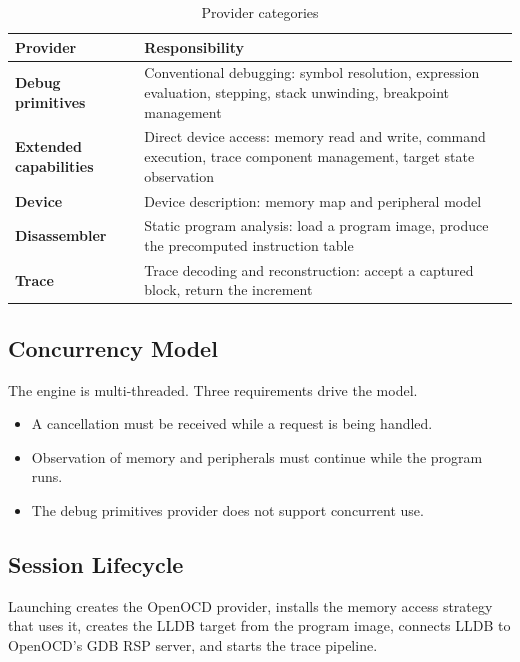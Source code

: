 \begin{table}[H]
    \centering
    \caption{Provider categories}
    \label{tab:providers}
    \begin{tabularx}{\linewidth}{| @{}>{\hsize\bfseries}Y | >{\hsize}Y@{} |}
        \hline
        Provider & \textbf{Responsibility} \\
        \hline
        Debug primitives & Conventional debugging: symbol resolution, expression evaluation, stepping, stack unwinding, breakpoint management \\
        \hline
        Extended capabilities & Direct device access: memory read and write, command execution, trace component management, target state observation \\
        \hline
        Device & Device description: memory map and peripheral model \\
        \hline
        Disassembler & Static program analysis: load a program image, produce the precomputed instruction table \\
        \hline
        Trace & Trace decoding and reconstruction: accept a captured block, return the increment \\
        \hline
    \end{tabularx}
\end{table}

\subsection{Concurrency Model}
\label{subsec:concurrency}
The engine is multi-threaded. Three requirements drive the model.

\begin{itemize}
    \item A cancellation must be received while a request is being handled.
    \item Observation of memory and peripherals must continue while the program runs.
    \item The debug primitives provider does not support concurrent use.
\end{itemize}

\subsection{Session Lifecycle}

Launching creates the OpenOCD provider, installs the memory access strategy that uses it, creates the LLDB target from the program image, connects LLDB to OpenOCD's GDB RSP server, and starts the trace pipeline.


